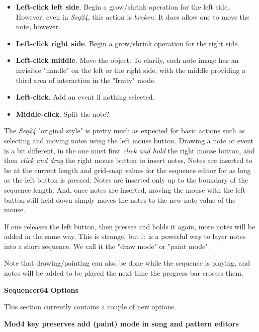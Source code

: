    \begin{itemize}
      \item \textbf{Left-click left side}.
         Begin a grow/shrink operation for the left side.
         However, even in \textsl{Seq24}, this action is \textsl{broken}.
         It does allow one to move the note, however.
      \item \textbf{Left-click right side}.
         Begin a grow/shrink operation for the right side.
      \item \textbf{Left-click middle}.
         Move the object.  To clarify, each note image
         has an invisible "handle" on the left or the right side, with the
         middle providing a third area of interaction in the "fruity" mode.
      \item \textbf{Left-click}.
         Add an event if nothing selected.
      \item \textbf{Middle-click}.
         Split the note?
   \end{itemize}

   The \textsl{Seq24} "original style" is pretty much as expected for basic
   actions such as selecting and moving notes using the left mouse button.
   Drawing a note or event is a bit different, in the one must first
   \textsl{click and hold} the right mouse button, and then
   \textsl{click and drag} the right mouse button to insert notes,
   Notes are inserted to be at the current length and grid-snap values for
   the sequence editor for as long as the left button is pressed.
   Notes are inserted only up to the boundary of the sequence length.
   And, once notes are inserted, moving the mouse with the left button still
   held down simply moves the notes to the new note value of the mouse.

   If one releases the left button, then presses and holds it again,
   more notes will be added in the same way.
   This is strange, but it is a powerful way to layer notes into a short
   sequence.
   We call it the   "draw mode" or
     "paint mode".

   Note that drawing/painting can also be done while the sequence is playing,
   and notes will be added to be played the next time the progress bar crosses
   them.

   \textbf{Sequencer64 Options}

   This section currently contains a couple of new options.

   \label{new_mod4_mode}
   \textbf{Mod4 key preserves add (paint) mode in song and pattern editors}


